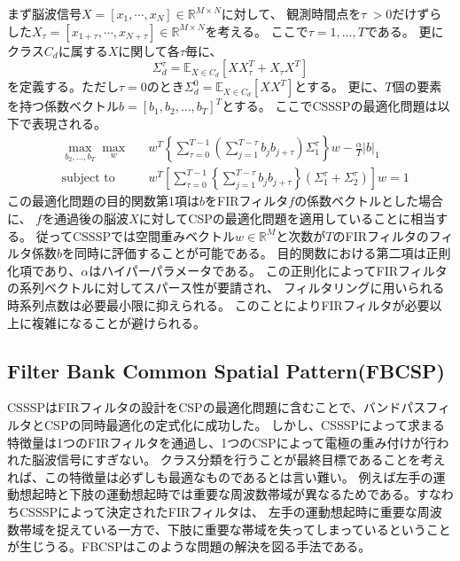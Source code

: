まず脳波信号\(X = \left[ x_1, \cdots, x_N \right] \in \mathbb{R}^{M \times N}\)に対して、
観測時間点を\(\tau\ > 0\)だけずらした\(X_{\tau} = \left[ x_{1+\tau}, \cdots, x_{N+\tau} \right] \in \mathbb{R}^{M \times N}\)を考える。
ここで$\tau = 1,\ldots,T$である。
更にクラス\( C_d \)に属する\( X \)に関して各\(\tau\)毎に、
\begin{equation}
    \Sigma_{d}^{\tau} = \mathbb E_{X \in C_d} \left[ XX_{\tau}^T + X_{\tau}X^T \right]
\end{equation}
を定義する。ただし\(\tau=0\)のとき\( \Sigma_{d}^{0} = \mathbb E_{X \in C_d} \left[XX^T \right] \)とする。
更に、\(T\)個の要素を持つ係数ベクトル$b=[b_1,b_2,\ldots,b_T]^T$とする。
ここでCSSSPの最適化問題は以下で表現される。
\begin{equation}
    \begin{aligned}
        & \max_{b_2,\ldots,b_T} \max_{w}
        & & w^T \left\{ \sum_{\tau = 0}^{T-1} \left( \sum_{j=1}^{T-\tau} b_j b_{j+\tau} \right) \Sigma_1^{\tau} \right\} w - \frac{\alpha}{T}|b|_1 \\
        & \text{subject to}
        & &  w^T \left[\sum_{\tau = 0}^{T-1} \left\{ \sum_{j=1}^{T-\tau}b_jb_{j+\tau} \right\} (\Sigma_1^{\tau} + \Sigma_2^{\tau}) \right] w = 1
    \end{aligned}
\end{equation}
この最適化問題の目的関数第1項は\(b\)をFIRフィルタ\(f\)の係数ベクトルとした場合に、
\(f\)を通過後の脳波\(X\)に対してCSPの最適化問題を適用していることに相当する。
従ってCSSSPでは空間重みベクトル\(w \in \mathbb R^M\)と次数が\(T\)のFIRフィルタのフィルタ係数\(b\)を同時に評価することが可能である。
目的関数における第二項は正則化項であり、$\alpha$はハイパーパラメータである。
この正則化によってFIRフィルタの系列ベクトルに対してスパース性が要請され、
フィルタリングに用いられる時系列点数は必要最小限に抑えられる。
このことによりFIRフィルタが必要以上に複雑になることが避けられる。


\subsection{Filter Bank Common Spatial Pattern(FBCSP)}
CSSSPはFIRフィルタの設計をCSPの最適化問題に含むことで、バンドパスフィルタとCSPの同時最適化の定式化に成功した。
しかし、CSSSPによって求まる特徴量は1つのFIRフィルタを通過し、1つのCSPによって電極の重み付けが行われた脳波信号にすぎない。
クラス分類を行うことが最終目標であることを考えれば、この特徴量は必ずしも最適なものであるとは言い難い。
例えば左手の運動想起時と下肢の運動想起時では重要な周波数帯域が異なるためである。すなわちCSSSPによって決定されたFIRフィルタは、
左手の運動想起時に重要な周波数帯域を捉えている一方で、下肢に重要な帯域を失ってしまっているということが生じうる。FBCSPはこのような問題の解決を図る手法である。

